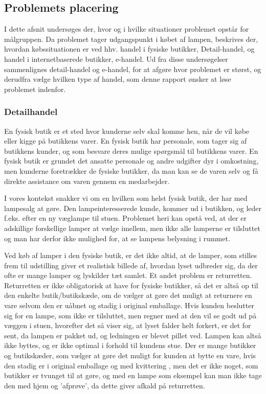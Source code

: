 \subsection{Problemets placering}
I dette afsnit undersøges der, hvor og i hvilke situationer problemet opstår for målgruppen. Da problemet tager udgangspunkt i købet af lampen, beskrives der, hvordan købssituationen er ved hhv. handel i fysiske butikker, Detail-handel, og handel i internetbaserede butikker, e-handel. Ud fra disse undersøgelser sammenlignes detail-handel og e-handel, for at afgøre hvor problemet er størst, og derudfra vælge hvilken type af handel, som denne rapport ønsker at løse problemet indenfor.

\subsubsection{Detailhandel}
En fysisk butik er et sted hvor kunderne selv skal komme hen, når de vil købe eller kigge på butikkens varer. En fysisk butik har personale, som tager sig af butikkens kunder, og som besvare deres mulige spørgsmål til butikkens varer. En fysisk butik er grundet det ansatte personale og andre udgifter dyr i omkostning, men kunderne foretrækker de fysiske butikker, da man kan se de varen selv og få direkte assistance om varen gennem en medarbejder\cite{fysisk_kontra_online}.

I vores kontekst snakker vi om en hvilken som helst fysisk butik, der har med lampesalg at gøre. Den lampeinteresserede kunde, kommer ud i butikken, og leder f.eks. efter en ny væglampe til stuen. Problemet heri kan opstå ved, at der er adskillige forskellige lamper at vælge imellem, men ikke alle lamperne er tilsluttet og man har derfor ikke mulighed for, at se lampens belysning i rummet.

Ved køb af lamper i den fysiske butik, er det ikke altid, at de lamper, som stilles frem til udstilling giver et realistisk billede af, hvordan lyset udbreder sig, da der ofte er mange lamper og lyskilder tæt samlet. Et andet problem er returretten. Returretten er ikke obligatorisk at have for fysiske butikker, så det er altså op til den enkelte butik/butikskæde, om de vælger at gøre det muligt at returnere en vare selvom den er uåbnet og stadig i original emballage\cite{fortrydelsesret}. Hvis kunden beslutter sig for en lampe, som ikke er tilsluttet, men regner med at den vil se godt ud på væggen i stuen, hvorefter det så viser sig, at lyset falder helt forkert, er det for sent, da lampen er pakket ud, og ledningen er blevet pillet ved. Lampen kan altså ikke byttes, og er ikke optimal i forhold til kundens stue. Der er mange butikker og butikskæder, som vælger at gøre det muligt for kunden at bytte en vare, hvis den stadig er i original emballage og med kvittering \cite{ikea_returret}, men det er ikke noget, som butikker er tvunget til at gøre, og med en lampe som eksempel kan man ikke tage den med hjem og ’afprøve’, da dette giver afkald på returretten.


